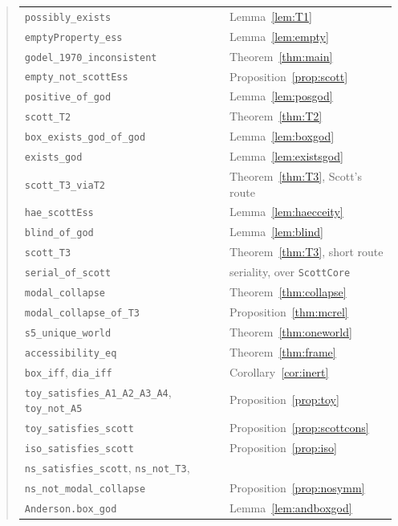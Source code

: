 \documentclass[11pt]{article}
\theoremstyle{plain}
\theoremstyle{definition}
\begin{document}
\begin{quote}\small
\begin{tabular}{@{}ll@{}}
\verb|possibly_exists|            & Lemma~\ref{lem:T1} \\
\verb|emptyProperty_ess|          & Lemma~\ref{lem:empty} \\
\verb|godel_1970_inconsistent|    & Theorem~\ref{thm:main} \\
\verb|empty_not_scottEss|         & Proposition~\ref{prop:scott} \\
\verb|positive_of_god|            & Lemma~\ref{lem:posgod} \\
\verb|scott_T2|                   & Theorem~\ref{thm:T2} \\
\verb|box_exists_god_of_god|      & Lemma~\ref{lem:boxgod} \\
\verb|exists_god|                 & Lemma~\ref{lem:existsgod} \\
\verb|scott_T3_viaT2|             & Theorem~\ref{thm:T3}, Scott's route \\
\verb|hae_scottEss|               & Lemma~\ref{lem:haecceity} \\
\verb|blind_of_god|               & Lemma~\ref{lem:blind} \\
\verb|scott_T3|                   & Theorem~\ref{thm:T3}, short route \\
\verb|serial_of_scott|            & seriality, over \verb|ScottCore| \\
\verb|modal_collapse|             & Theorem~\ref{thm:collapse} \\
\verb|modal_collapse_of_T3|       & Proposition~\ref{thm:mcrel} \\
\verb|s5_unique_world|            & Theorem~\ref{thm:oneworld} \\
\verb|accessibility_eq|           & Theorem~\ref{thm:frame} \\
\verb|box_iff|, \verb|dia_iff|    & Corollary~\ref{cor:inert} \\
\verb|toy_satisfies_A1_A2_A3_A4|, \verb|toy_not_A5| & Proposition~\ref{prop:toy} \\
\verb|toy_satisfies_scott|        & Proposition~\ref{prop:scottcons} \\
\verb|iso_satisfies_scott|        & Proposition~\ref{prop:iso} \\
\verb|ns_satisfies_scott|, \verb|ns_not_T3|, & \\
\quad \verb|ns_not_modal_collapse| & Proposition~\ref{prop:nosymm} \\
\verb|Anderson.box_god|           & Lemma~\ref{lem:andboxgod} \\

\end{tabular}
\end{quote}
\end{document}
